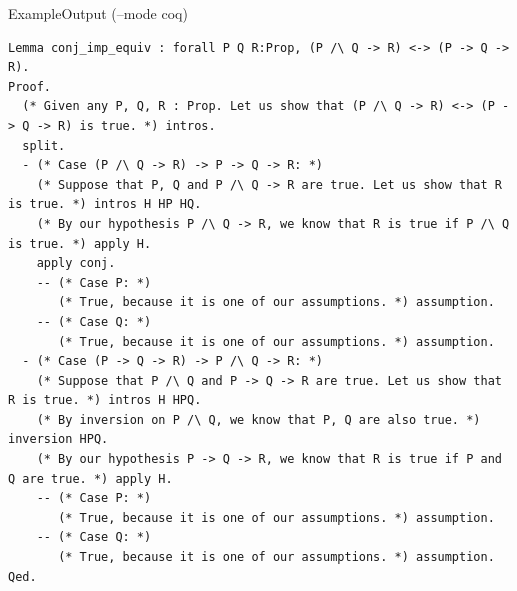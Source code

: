 \documentclass[pdf]{beamer}
\begin{document}
\begin{frame}[fragile]{Example}{Output (--mode coq)}
\begin{adjustbox}{minipage=\linewidth,bgcolor=coqatoo-gray,trim=-3pt 5pt -3pt 5pt}
\begin{lstlisting}[label=listing:output]
Lemma conj_imp_equiv : forall P Q R:Prop, (P /\ Q -> R) <-> (P -> Q -> R).
Proof.
  (* Given any P, Q, R : Prop. Let us show that (P /\ Q -> R) <-> (P -> Q -> R) is true. *) intros.
  split.
  - (* Case (P /\ Q -> R) -> P -> Q -> R: *) 
    (* Suppose that P, Q and P /\ Q -> R are true. Let us show that R is true. *) intros H HP HQ.
    (* By our hypothesis P /\ Q -> R, we know that R is true if P /\ Q  is true. *) apply H.
    apply conj.
    -- (* Case P: *)
       (* True, because it is one of our assumptions. *) assumption.
    -- (* Case Q: *)
       (* True, because it is one of our assumptions. *) assumption.
  - (* Case (P -> Q -> R) -> P /\ Q -> R: *)
    (* Suppose that P /\ Q and P -> Q -> R are true. Let us show that R is true. *) intros H HPQ.
    (* By inversion on P /\ Q, we know that P, Q are also true. *) inversion HPQ.
    (* By our hypothesis P -> Q -> R, we know that R is true if P and Q are true. *) apply H.
    -- (* Case P: *)
       (* True, because it is one of our assumptions. *) assumption.
    -- (* Case Q: *)
       (* True, because it is one of our assumptions. *) assumption.
Qed.
\end{lstlisting}
\end{adjustbox}
\end{frame}
\end{document}
